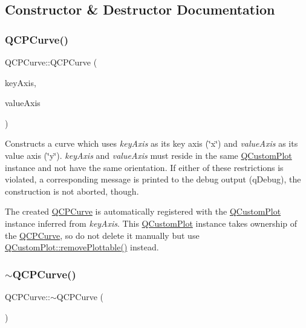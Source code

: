 \subsection{Constructor \& Destructor Documentation}
\mbox{\label{class_q_c_p_curve_a36de58e2652b3fa47bdf9187d421d3ce}} 
\subsubsection{\texorpdfstring{Q\+C\+P\+Curve()}{QCPCurve()}}
{\footnotesize\ttfamily Q\+C\+P\+Curve\+::\+Q\+C\+P\+Curve (\begin{DoxyParamCaption}\item[{\hyperlink{class_q_c_p_axis}{Q\+C\+P\+Axis} $\ast$}]{key\+Axis,  }\item[{\hyperlink{class_q_c_p_axis}{Q\+C\+P\+Axis} $\ast$}]{value\+Axis }\end{DoxyParamCaption})\hspace{0.3cm}{\ttfamily [explicit]}}

Constructs a curve which uses {\itshape key\+Axis} as its key axis (\char`\"{}x\char`\"{}) and {\itshape value\+Axis} as its value axis (\char`\"{}y\char`\"{}). {\itshape key\+Axis} and {\itshape value\+Axis} must reside in the same \hyperlink{class_q_custom_plot}{Q\+Custom\+Plot} instance and not have the same orientation. If either of these restrictions is violated, a corresponding message is printed to the debug output (q\+Debug), the construction is not aborted, though.

The created \hyperlink{class_q_c_p_curve}{Q\+C\+P\+Curve} is automatically registered with the \hyperlink{class_q_custom_plot}{Q\+Custom\+Plot} instance inferred from {\itshape key\+Axis}. This \hyperlink{class_q_custom_plot}{Q\+Custom\+Plot} instance takes ownership of the \hyperlink{class_q_c_p_curve}{Q\+C\+P\+Curve}, so do not delete it manually but use \hyperlink{class_q_custom_plot_af3dafd56884208474f311d6226513ab2}{Q\+Custom\+Plot\+::remove\+Plottable()} instead. \mbox{\label{class_q_c_p_curve_a99ee5136754884a220cc0bcacfe419a3}} 
\subsubsection{\texorpdfstring{$\sim$\+Q\+C\+P\+Curve()}{~QCPCurve()}}
{\footnotesize\ttfamily Q\+C\+P\+Curve\+::$\sim$\+Q\+C\+P\+Curve (\begin{DoxyParamCaption}{ }\end{DoxyParamCaption})\hspace{0.3cm}{\ttfamily [virtual]}}



